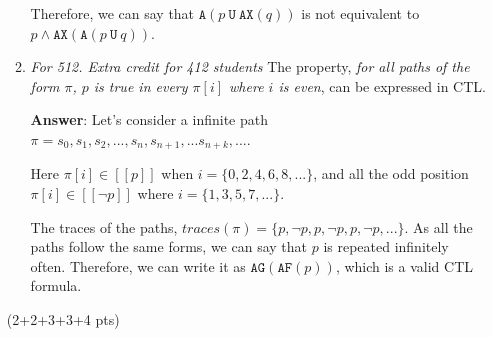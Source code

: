 \documentclass[11pt]{article}
\newcommand{\ax}[1]{\texttt{AX}(#1)}
\newcommand{\af}[1]{\texttt{AF}(#1)}
\newcommand{\ag}[1]{\texttt{AG}(#1)}
\newcommand{\au}[2]{\texttt{A}(#1\ \texttt{U}\ #2)}
\begin{document}
\begin{enumerate}
\begin{enumerate}
Therefore, we can say that $\au{p}{\ax{q}}$ is not equivalent to $p \land \ax{\au{p}{q}}$.

    
  \item \emph{For 512. Extra credit for 412 students}
    The property, \emph{for all paths of the form $\pi$, $p$ is true in every $\pi[i]$ where $i$ is even},
    can be expressed in CTL.
    
    \textbf{Answer}: Let's consider a infinite path $\pi = s_0, s_1, s_2, ..., s_n, s_{n+1}, ... s_{n+k}, ...$. 

    Here $\pi[i] \in [[p]]$ when $i=\{0, 2, 4, 6, 8, ... \}$, and all the odd position $\pi[i] \in [[ \neg p]]$ where $i = \{ 1,3,5,7, ...\}$. 

    The traces of the paths, $traces(\pi)= \{p, \neg p, p, \neg p, p, \neg p, ... \}$. As all the paths follow the same forms, we can say that $p$ is repeated infinitely often. Therefore, we can write it as $\ag{\af{p}}$, which is a valid CTL formula. 
    
  \end{enumerate}
  \hfill (2+2+3+3+4 pts)
  
\end{enumerate}
\end{document}
